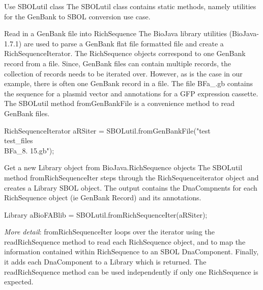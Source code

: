 \begin{DoxyEnumerate}
\item \begin{DoxyParagraph}{Use SBOLutil class}
The SBOLutil class contains static methods, namely utilities for the GenBank to SBOL conversion use case.
\end{DoxyParagraph}

\item \begin{DoxyParagraph}{Read in a GenBank file into RichSequence}
The BioJava library utilities (BioJava-\/1.7.1) are used to parse a GenBank flat file formatted file and create a RichSequenceIterator. The RichSequence objects correspond to one GenBank record from a file. Since, GenBank files can contain multiple records, the collection of records needs to be iterated over. However, as is the case in our example, there is often one GenBank record in a file. The file BFa\_.gb contains the sequence for a plasmid vector and annotations for a GFP expression cassette. The SBOLutil method fromGenBankFile is a convenience method to read GenBank files. 
\begin{DoxyCode}
RichSequenceIterator aRSiter = SBOLutil.fromGenBankFile("test\\test_files\\BFa_8.
      15.gb");
\end{DoxyCode}

\end{DoxyParagraph}

\item \begin{DoxyParagraph}{Get a new Library object from BioJava.RichSequence objects}
The SBOLutil method fromRichSequenceIter steps through the RichSequenceiterator object and creates a Library SBOL object. The output contains the DnaCompnents for each RichSequence object (ie GenBank Record) and its annotations. 
\begin{DoxyCode}
 Library aBioFABlib = SBOLutil.fromRichSequenceIter(aRSiter); 
\end{DoxyCode}
 {\itshape  More detail\/}: fromRichSequenceIter loops over the iterator using the readRichSequence method to read each RichSequence object, and to map the information contained within RichSequence to an SBOL DnaComponent. Finally, it adds each DnaComponent to a Library which is returned. The readRichSequence method can be used independently if only one RichSequence is expected.
\end{DoxyParagraph}


\end{DoxyEnumerate}
